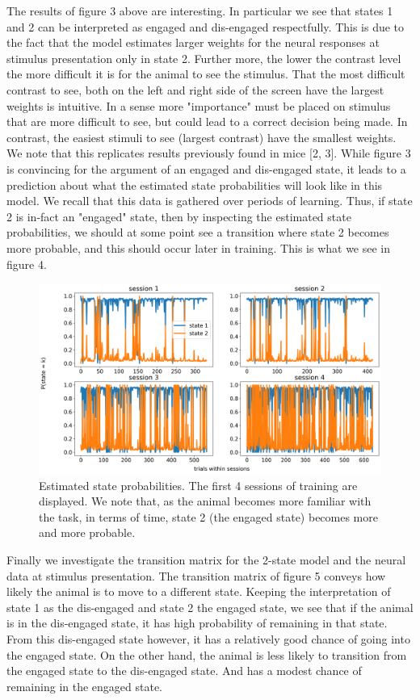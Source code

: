 \documentclass{article}
\begin{document}
\noindent
The results of figure 3 above are interesting. In particular we see that states 1 and 2 can be interpreted as engaged and dis-engaged respectfully. This is due to the fact that the model estimates larger weights for the neural responses at stimulus presentation only in state 2. Further more, the lower the contrast level the more difficult it is for the animal to see the stimulus. That the most difficult contrast to see, both on the left and right side of the screen have the largest weights is intuitive. In a sense more "importance" must be placed on stimulus that are more difficult to see, but could lead to a correct decision being made. In contrast, the easiest stimuli to see (largest contrast) have the smallest weights. We note that this replicates results previously found in mice [2, 3]. While figure 3 is convincing for the argument of an engaged and dis-engaged state, it leads to a prediction about what the estimated state probabilities will look like in this model. We recall that this data is gathered over periods of learning. Thus, if state 2 is in-fact an "engaged" state, then by inspecting the estimated state probabilities, we should at some point see a transition where state 2 becomes more probable, and this should occur later in training. This is what we see in figure 4.
\begin{figure}[H]
\centering
 \includegraphics[width=14cm]{stim_images/first_4_days_2state_gammas.png}
 \caption{Estimated state probabilities. The first 4 sessions of training are displayed. We note that, as the animal becomes more familiar with the task, in terms of time, state 2 (the engaged state) becomes more and more probable. }
\end{figure}

Finally we investigate the transition matrix for the 2-state model and the neural data at stimulus presentation. The transition matrix of figure 5 conveys how likely the animal is to move to a different state. Keeping the interpretation of state 1 as the dis-engaged and state 2 the engaged state, we see that if the animal is in the dis-engaged state, it has high probability of remaining in that state. From this dis-engaged state however, it has a relatively good chance of going into the engaged state. On the other hand, the animal is less likely to transition from the engaged state to the dis-engaged state. And has a modest chance of remaining in the engaged state. 
\end{document}
